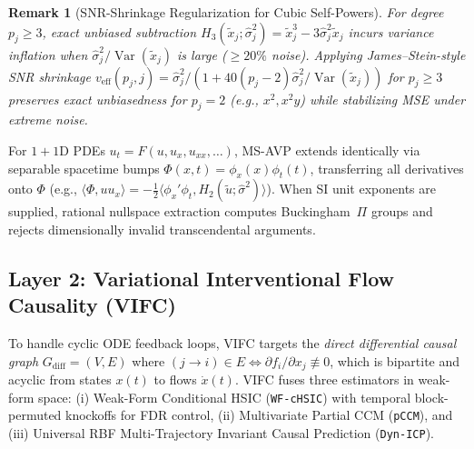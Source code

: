 \documentclass[10pt]{article} %
\newtheorem{remark}{Remark}
\begin{document}
\begin{remark}[SNR-Shrinkage Regularization for Cubic Self-Powers]
\label{rem:shrinkage}
For degree $p_j \ge 3$, exact unbiased subtraction $H_3(\tilde{x}_j;\hat{\sigma}_j^2)=\tilde{x}_j^3 - 3\hat{\sigma}_j^2\tilde{x}_j$ incurs variance inflation when $\hat{\sigma}_j^2/\operatorname{Var}(\tilde{x}_j)$ is large ($\ge 20\%$ noise). Applying James--Stein-style SNR shrinkage $v_{\text{eff}}(p_j, j) = \hat{\sigma}_j^2 / (1 + 40(p_j - 2)\hat{\sigma}_j^2/\operatorname{Var}(\tilde{x}_j))$ for $p_j \ge 3$ preserves exact unbiasedness for $p_j=2$ (e.g., $x^2, x^2y$) while stabilizing MSE under extreme noise.
\end{remark}

For $1+1$D PDEs $u_t = F(u, u_x, u_{xx}, \dots)$, MS-AVP extends identically via separable spacetime bumps $\Phi(x,t)=\phi_x(x)\phi_t(t)$, transferring all derivatives onto $\Phi$ (e.g., $\langle \Phi, u u_x\rangle = -\frac{1}{2}\langle \phi_x'\phi_t, H_2(\tilde{u};\hat{\sigma}^2)\rangle$). When SI unit exponents are supplied, rational nullspace extraction computes Buckingham~$\Pi$ groups and rejects dimensionally invalid transcendental arguments.

\subsection{Layer 2: Variational Interventional Flow Causality (VIFC)}
To handle cyclic ODE feedback loops, VIFC targets the \emph{direct differential causal graph} $G_{\text{diff}} = (V, E)$ where $(j \to i) \in E \iff \partial f_i / \partial x_j \not\equiv 0$, which is bipartite and acyclic from states $x(t)$ to flows $\dot{x}(t)$. VIFC fuses three estimators in weak-form space: (i) Weak-Form Conditional HSIC (\texttt{WF-cHSIC}) with temporal block-permuted knockoffs for FDR control, (ii) Multivariate Partial CCM (\texttt{pCCM}), and (iii) Universal RBF Multi-Trajectory Invariant Causal Prediction (\texttt{Dyn-ICP}).
\end{document}
